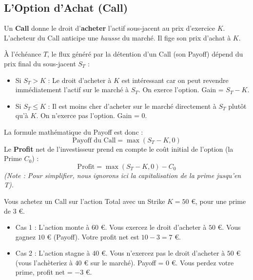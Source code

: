 \subsection{L'Option d'Achat (Call)}

\begin{definitionbox}[Le Call]
Un \textbf{Call} donne le droit d'\textbf{acheter} l'actif sous-jacent au prix d'exercice $K$.
L'acheteur du Call anticipe une \textit{hausse} du marché. Il fige son prix d'achat à $K$.
\end{definitionbox}

\begin{theorembox}
À l'échéance $T$, le flux généré par la détention d'un Call (son Payoff) dépend du prix final du sous-jacent $S_T$ :
\begin{itemize}[label=$\rightarrow$]
    \item Si $S_T > K$ : Le droit d'acheter à $K$ est intéressant car on peut revendre immédiatement l'actif sur le marché à $S_T$. On exerce l'option. Gain = $S_T - K$.
    \item Si $S_T \leq K$ : Il est moins cher d'acheter sur le marché directement à $S_T$ plutôt qu'à $K$. On n'exerce pas l'option. Gain = $0$.
\end{itemize}
La formule mathématique du Payoff est donc :
\begin{equation*}
    \text{Payoff du Call} = \max(S_T - K, 0)
\end{equation*}
Le \textbf{Profit} net de l'investisseur prend en compte le coût initial de l'option (la Prime $C_0$) :
\begin{equation*}
    \text{Profit} = \max(S_T - K, 0) - C_0
\end{equation*}
\textit{(Note : Pour simplifier, nous ignorons ici la capitalisation de la prime jusqu'en T).}
\end{theorembox}

\begin{examplebox}
Vous achetez un Call sur l'action Total avec un Strike $K = 50$ €, pour une prime de $3$ €.
\begin{itemize}[label=$\cdot$]
    \item Cas 1 : L'action monte à $60$ €. Vous exercez le droit d'acheter à $50$ €. Vous gagnez $10$ € (Payoff). Votre profit net est $10 - 3 = 7$ €.
    \item Cas 2 : L'action stagne à $40$ €. Vous n'exercez pas le droit d'acheter à $50$ € (vous l'achèteriez à $40$ € sur le marché). Payoff = $0$ €. Vous perdez votre prime, profit net = $-3$ €.
\end{itemize}
\end{examplebox}

